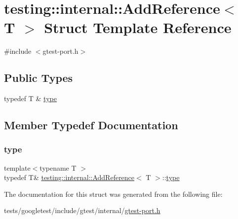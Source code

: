 \hypertarget{structtesting_1_1internal_1_1AddReference}{}\section{testing\+:\+:internal\+:\+:Add\+Reference$<$ T $>$ Struct Template Reference}
\label{structtesting_1_1internal_1_1AddReference}


{\ttfamily \#include $<$gtest-\/port.\+h$>$}

\subsection*{Public Types}
\begin{DoxyCompactItemize}
\item 
typedef T \& \hyperlink{structtesting_1_1internal_1_1AddReference_a2df8dd7c4e41f6390e6e66b1a9a67bb4}{type}
\end{DoxyCompactItemize}


\subsection{Member Typedef Documentation}
\mbox{\label{structtesting_1_1internal_1_1AddReference_a2df8dd7c4e41f6390e6e66b1a9a67bb4}} 
\subsubsection{\texorpdfstring{type}{type}}
{\footnotesize\ttfamily template$<$typename T $>$ \\
typedef T\& \hyperlink{structtesting_1_1internal_1_1AddReference}{testing\+::internal\+::\+Add\+Reference}$<$ T $>$\+::\hyperlink{structtesting_1_1internal_1_1AddReference_a2df8dd7c4e41f6390e6e66b1a9a67bb4}{type}}



The documentation for this struct was generated from the following file\+:\begin{DoxyCompactItemize}
\item 
tests/googletest/include/gtest/internal/\hyperlink{gtest-port_8h}{gtest-\/port.\+h}\end{DoxyCompactItemize}

